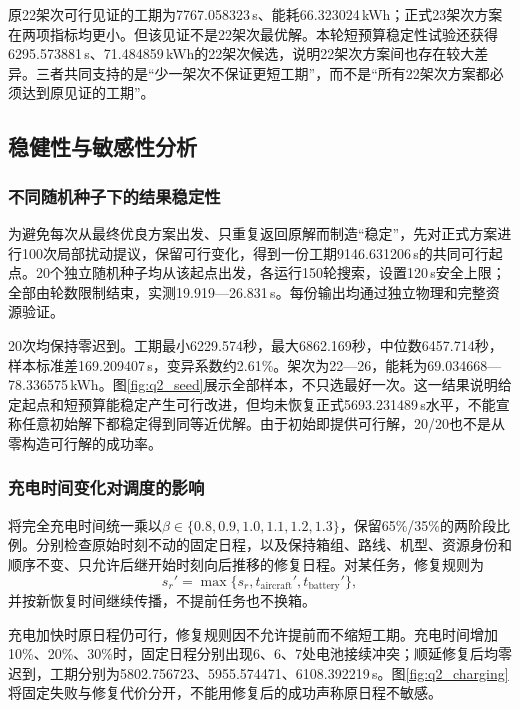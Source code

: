 原22架次可行见证的工期为7767.058323\,s、能耗66.323024\,kWh；正式23架次方案在两项指标均更小。但该见证不是22架次最优解。本轮短预算稳定性试验还获得6295.573881\,s、71.484859\,kWh的22架次候选，说明22架次方案间也存在较大差异。三者共同支持的是“少一架次不保证更短工期”，而不是“所有22架次方案都必须达到原见证的工期”。





\subsection{稳健性与敏感性分析}
\label{sec:q2_robust}
\subsubsection{不同随机种子下的结果稳定性}
为避免每次从最终优良方案出发、只重复返回原解而制造“稳定”，先对正式方案进行100次局部扰动提议，保留可行变化，得到一份工期9146.631206\,s的共同可行起点。20个独立随机种子均从该起点出发，各运行150轮搜索，设置120\,s安全上限；全部由轮数限制结束，实测19.919—26.831\,s。每份输出均通过独立物理和完整资源验证。

20次均保持零迟到。工期最小6229.574秒，最大6862.169秒，中位数6457.714秒，样本标准差169.209407\,s，变异系数约2.61\%。架次为22—26，能耗为69.034668—78.336575\,kWh。图\ref{fig:q2_seed}展示全部样本，不只选最好一次。这一结果说明给定起点和短预算能稳定产生可行改进，但均未恢复正式5693.231489\,s水平，不能宣称任意初始解下都稳定得到同等近优解。由于初始即提供可行解，20/20也不是从零构造可行解的成功率。

\subsubsection{充电时间变化对调度的影响}
将完全充电时间统一乘以$\beta\in\{0.8,0.9,1.0,1.1,1.2,1.3\}$，保留65\%/35\%的两阶段比例。分别检查原始时刻不动的固定日程，以及保持箱组、路线、机型、资源身份和顺序不变、只允许后继开始时刻向后推移的修复日程。对某任务，修复规则为
\begin{equation}
 s_r'=\max\{s_r,t_{\mathrm{aircraft}}',t_{\mathrm{battery}}'\},
\label{eq:q2_repair}
\end{equation}
并按新恢复时间继续传播，不提前任务也不换箱。

充电加快时原日程仍可行，修复规则因不允许提前而不缩短工期。充电时间增加10\%、20\%、30\%时，固定日程分别出现6、6、7处电池接续冲突；顺延修复后均零迟到，工期分别为5802.756723、5955.574471、6108.392219\,s。图\ref{fig:q2_charging}将固定失败与修复代价分开，不能用修复后的成功声称原日程不敏感。

